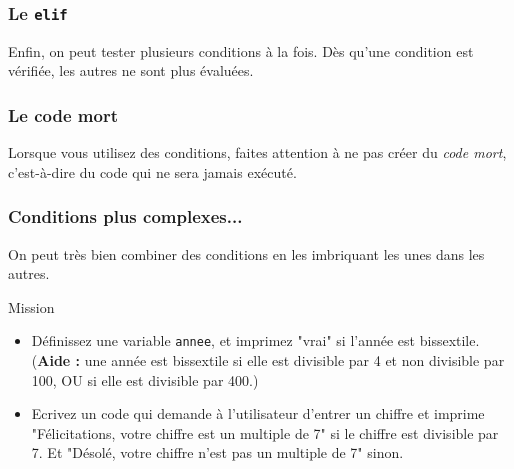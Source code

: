 \documentclass[handout]{beamer}
\begin{document}

\begin{frame}
\frametitle{Le \texttt{elif}}
Enfin, on peut tester plusieurs conditions à la fois. Dès qu'une condition est vérifiée, les autres ne sont plus évaluées.

\elifexemple

\end{frame}



\begin{frame}
\frametitle{Le code mort}

Lorsque vous utilisez des conditions, faites attention à ne pas créer du \textit{code mort}, c'est-à-dire du code qui ne sera jamais exécuté.

\codemort
\codemortdeux

\end{frame}


\begin{frame}
\frametitle{Conditions plus complexes...}
On peut très bien combiner des conditions en les imbriquant les unes dans les autres.
\conditionscomplexes
\end{frame}

\begin{frame}
    \begin{block}{Mission}
    \begin{itemize}
        \item Définissez une variable \texttt{annee}, et imprimez "vrai" si l'année est bissextile. (\textbf{Aide :} une année est bissextile si elle est divisible par 4 et non divisible par 100, OU si elle est divisible par 400.)
        \item Ecrivez un code qui demande à l'utilisateur d'entrer un chiffre et imprime "Félicitations, votre chiffre est un multiple de 7" si le chiffre est divisible par 7. Et "Désolé, votre chiffre n'est pas un multiple de 7" sinon.
    \end{itemize}
    \end{block}
\end{frame}
\end{document}
